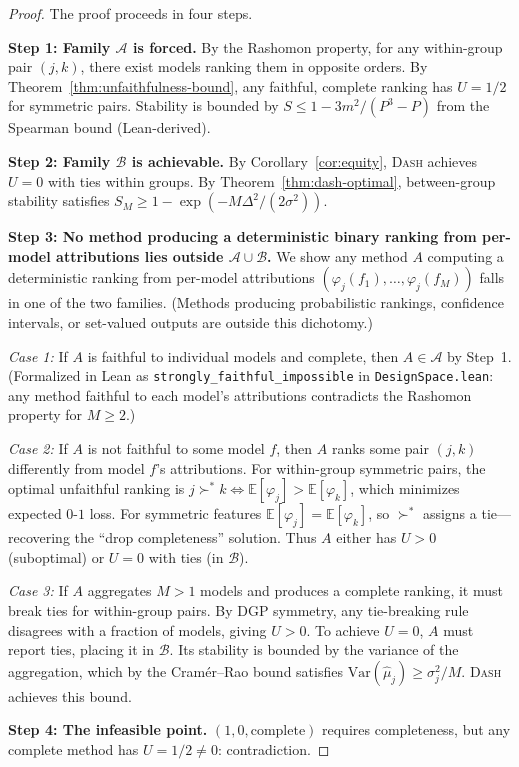 \documentclass{jmlr}
\newcommand{\E}{\mathbb{E}}
\newcommand{\Var}{\mathrm{Var}}
\newcommand{\DASH}{\textsc{Dash}}
\begin{document}
\begin{proof}
The proof proceeds in four steps.

\textbf{Step 1: Family $\mathcal{A}$ is forced.}
By the Rashomon property, for any within-group pair $(j,k)$, there exist models ranking them in opposite orders. By Theorem~\ref{thm:unfaithfulness-bound}, any faithful, complete ranking has $U = 1/2$ for symmetric pairs. Stability is bounded by $S \leq 1 - 3m^2/(P^3{-}P)$ from the Spearman bound (Lean-derived).

\textbf{Step 2: Family $\mathcal{B}$ is achievable.}
By Corollary~\ref{cor:equity}, \DASH{} achieves $U = 0$ with ties within groups. By Theorem~\ref{thm:dash-optimal}, between-group stability satisfies $S_M \geq 1 - \exp(-M\Delta^2/(2\sigma^2))$.

\textbf{Step 3: No method producing a deterministic binary ranking from per-model attributions lies outside $\mathcal{A} \cup \mathcal{B}$.}
We show any method $A$ computing a deterministic ranking from per-model attributions $(\varphi_j(f_1), \ldots, \varphi_j(f_M))$ falls in one of the two families. (Methods producing probabilistic rankings, confidence intervals, or set-valued outputs are outside this dichotomy.)

\emph{Case 1:} If $A$ is faithful to individual models and complete, then $A \in \mathcal{A}$ by Step~1. (Formalized in Lean as \texttt{strongly\_faithful\_impossible} in \texttt{DesignSpace.lean}: any method faithful to each model's attributions contradicts the Rashomon property for $M \geq 2$.)

\emph{Case 2:} If $A$ is not faithful to some model $f$, then $A$ ranks some pair $(j,k)$ differently from model $f$'s attributions. For within-group symmetric pairs, the optimal unfaithful ranking is $j \succ^* k \Leftrightarrow \E[\varphi_j] > \E[\varphi_k]$, which minimizes expected $0$-$1$ loss. For symmetric features $\E[\varphi_j] = \E[\varphi_k]$, so $\succ^*$ assigns a tie---recovering the ``drop completeness'' solution. Thus $A$ either has $U > 0$ (suboptimal) or $U = 0$ with ties (in $\mathcal{B}$).

\emph{Case 3:} If $A$ aggregates $M > 1$ models and produces a complete ranking, it must break ties for within-group pairs. By DGP symmetry, any tie-breaking rule disagrees with a fraction of models, giving $U > 0$. To achieve $U = 0$, $A$ must report ties, placing it in $\mathcal{B}$. Its stability is bounded by the variance of the aggregation, which by the Cram\'er--Rao bound satisfies $\Var(\hat\mu_j) \geq \sigma_j^2/M$. \DASH{} achieves this bound.

\textbf{Step 4: The infeasible point.}
$(1, 0, \text{complete})$ requires completeness, but any complete method has $U = 1/2 \neq 0$: contradiction.
\end{proof}
\end{document}
